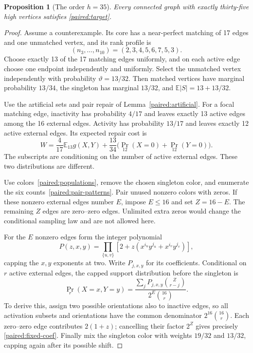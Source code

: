 \documentclass[11pt,a4paper]{article}
\newtheorem{proposition}[theorem]{Proposition}
\theoremstyle{definition}\newtheorem{definition}[theorem]{Definition}
\theoremstyle{remark}\newtheorem{remark}[theorem]{Remark}
\begin{document}
\begin{proposition}[The order $h=35$]\label{paired:h35}
Every connected graph with exactly thirty-five high vertices satisfies
\eqref{paired:target}.
\end{proposition}
\begin{proof}
Assume a counterexample. Its core has a near-perfect matching of
17 edges and one unmatched vertex, and its rank profile is
\[
 (n_3,\ldots,n_{10})=(2,3,4,5,6,7,5,3).
\]
Choose exactly 13 of the 17 matching edges uniformly, and on each
active edge choose one endpoint independently and uniformly. Select
the unmatched vertex independently with probability $\vartheta=13/32$.
Then matched vertices have marginal probability $13/34$, the
singleton has marginal $13/32$, and
$\mathbb E|S|=13+13/32$.

Use the artificial sets and pair repair of
Lemma~\ref{paired:artificial}. For a focal matching edge, inactivity
has probability $4/17$ and leaves exactly 13 active edges among the
16 external edges. Activity has probability $13/17$ and leaves
exactly 12 active external edges. Its expected repair cost is
\begin{equation}\label{paired:fixed-W}
 W=\frac4{17}\mathbb E_{13}g(X,Y)
   +\frac{13}{34}\bigl(\Pr_{12}(X=0)+\Pr_{12}(Y=0)\bigr).
\end{equation}
The subscripts are conditioning on the number of active external
edges. These two distributions are different.

Use colors~\eqref{paired:populations}, remove the chosen singleton
color, and enumerate the six counts~\eqref{paired:pair-patterns}.
Pair unused nonzero colors with zeros. If these nonzero external
edges number $E$, impose $E\le16$ and set $Z=16-E$. The remaining
$Z$ edges are zero--zero edges. Unlimited extra zeros would change
the conditional sampling law and are not allowed here.

For the $E$ nonzero edges form the integer polynomial
\begin{equation}\label{paired:fixed-poly}
 P(z,x,y)=\prod_{\{u,v\}}
      \left[2+z(x^{i_u}y^{j_u}+x^{i_v}y^{j_v})\right],
\end{equation}
capping the $x,y$ exponents at two. Write $P_{j,x,y}$ for its
coefficients. Conditional on $r$ active external edges, the capped
support distribution before the singleton is
\begin{equation}\label{paired:fixed-coef}
 \Pr_r(X=x,Y=y)=
 \frac{\sum_j P_{j,x,y}\binom Z{r-j}}{2^E\binom{16}{r}}.
\end{equation}
To derive this, assign two possible orientations also to inactive
edges, so all activation subsets and orientations have the common
denominator $2^{16}\binom{16}{r}$. Each zero--zero edge contributes
$2(1+z)$; cancelling their factor $2^Z$ gives precisely
\eqref{paired:fixed-coef}. Finally mix the singleton color with
weights $19/32$ and $13/32$, capping again after its possible shift.


\end{proof}
\end{document}

